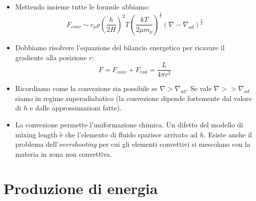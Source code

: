 \documentclass[11pt,a4paper]{article}
\begin{document}
\begin{itemize}
\item Mettendo insieme tutte le formule abbiamo:
\begin{equation}
F_{conv} \sim c_p \rho \left( \frac{h}{2 H} \right)^2 T \left( \frac{kT}{2 \mu m_p} \right)^{\frac{1}{2}} \left( \nabla - \nabla_{ad} \right)^{\frac{3}{2}}
\end{equation} 

\item Dobbiamo risolvere l'equazione del bilancio energetico per ricavare il gradiente alla posizione $r$:
\begin{equation}
F = F_{conv} + F_{rad} = \frac{L}{4 \pi r^2}
\end{equation}

\item Ricordiamo come la convezione sia possibile se $\nabla > \nabla_{ad}$. Se vale $\nabla >> \nabla_{ad}$ siamo in regime superadiabatico (la convezione dipende fortemente dal valore di $h$ e dalle approssimazioni fatte).

\item La convezione permette l'uniformazione chimica. Un difetto del modello di mixing length è che l'elemento di fluido sparisce arrivato ad $h$. Esiste anche il problema dell'\textit{overshooting} per cui gli elementi convettivi si mescolano con la materia in zona non convettiva.

\end{itemize}

\section{Produzione di energia}
\end{document}
